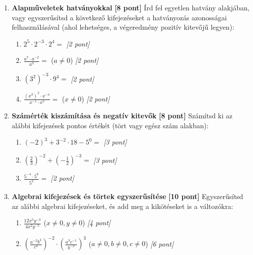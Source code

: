 \documentclass[11pt,a4paper]{article}
\begin{document}
\begin{enumerate}
    \item \textbf{Alapműveletek hatványokkal} \hfill \textbf{[8 pont]}
    Írd fel egyetlen hatvány alakjában, vagy egyszerűsítsd a következő kifejezéseket a hatványozás azonosságai felhasználásával (ahol lehetséges, a végeredmény pozitív kitevőjű legyen):
    \begin{enumerate}
        \item $2^5 \cdot 2^{-3} \cdot 2^4 =$ \hfill \textit{[2 pont]}
        \item $\frac{a^7 \cdot a^{-2}}{a^3} =$ \quad ($a \neq 0$) \hfill \textit{[2 pont]}
        \item $(3^2)^{-3} \cdot 9^4 =$ \hfill \textit{[2 pont]}
        \item $\frac{(x^3)^2 \cdot x^{-4}}{x^{-1} \cdot x^5} =$ \quad ($x \neq 0$) \hfill \textit{[2 pont]}
    \end{enumerate}

    \vspace{2mm}
    \item \textbf{Számérték kiszámítása és negatív kitevők} \hfill \textbf{[8 pont]}
    Számítsd ki az alábbi kifejezések pontos értékét (tört vagy egész szám alakban):
    \begin{enumerate}
        \item $(-2)^3 + 3^{-2} \cdot 18 - 5^0 =$ \hfill \textit{[3 pont]}
        \item $\left(\frac{2}{3}\right)^{-2} + \left(-\frac{1}{2}\right)^{-3} =$ \hfill \textit{[3 pont]}
        \item $\frac{5^{-4} \cdot 5^6}{5^2} =$ \hfill \textit{[2 pont]}
    \end{enumerate}

    \vspace{2mm}
    \item \textbf{Algebrai kifejezések és törtek egyszerűsítése} \hfill \textbf{[10 pont]}
    Egyszerűsítsd az alábbi algebrai kifejezéseket, és add meg a kikötéseket is a változókra:
    \begin{enumerate}
        \item $\frac{12x^5 y^{-3}}{4x^2 y^{-5}}$ \quad ($x \neq 0, y \neq 0$) \hfill \textit{[4 pont]}
        \item $\left( \frac{a^{-2} b^3}{c^4} \right)^{-2} \cdot \left( \frac{a^3 c^{-1}}{b^{-2}} \right)^3$ \quad ($a \neq 0, b \neq 0, c \neq 0$) \hfill \textit{[6 pont]}
    \end{enumerate}


\end{enumerate}
\end{document}
